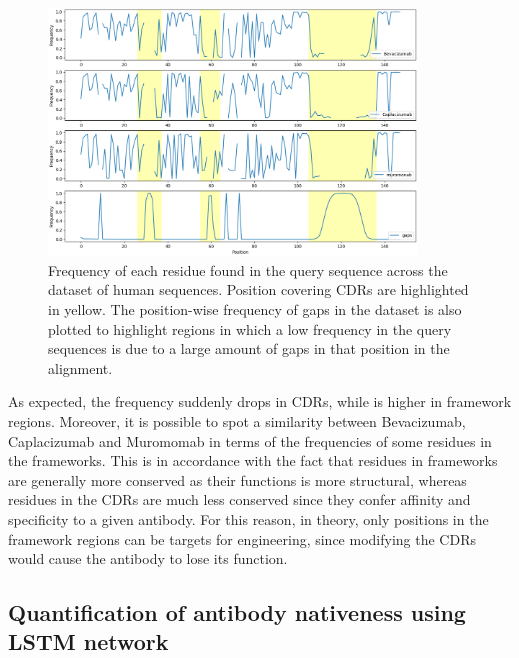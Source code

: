 \documentclass[11pt]{article}
\begin{document}
\begin{figure}[h]
    \centering
    \includegraphics[width=0.87\textwidth]{images/antibody_similarity.png}
    \caption{\small Frequency of each residue found in the query sequence across the dataset of human sequences. Position covering CDRs are highlighted in yellow. The position-wise frequency of gaps in the dataset is also plotted to highlight regions in which a low frequency in the query sequences is due to a large amount of gaps in that position in the alignment.}
    \label{fig:ab_similarity_plot}
\end{figure}



As expected, the frequency suddenly drops in CDRs, while is higher in framework regions. Moreover, it is possible to spot a similarity between Bevacizumab, Caplacizumab and Muromomab in terms of the frequencies of some residues in the frameworks. This is in accordance with the fact that residues in frameworks are generally more conserved as their functions is more structural, whereas residues in the CDRs are much less conserved since they confer affinity and specificity to a given antibody. For this reason, in theory, only positions in the framework regions can be targets for engineering, since modifying the CDRs would cause the antibody to lose its function.

\subsection{Quantification of antibody nativeness using LSTM network}
\end{document}
